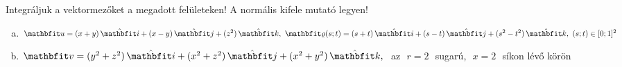 \documentclass[exercise]{math-standalone}
\begin{document}
\begin{exercise}{%
    Integráljuk a vektormezőket a megadott felületeken!
    A normális kifele mutató legyen!
  }
  \begin{enumerate}[a)]
    \item $\rvec u = \ijk{x + y}{x - y}{z^2}, \,\, \surfv (s;t) = \ijk{s + t}{s - t}{s^2 - t^2}, \,\, (s;t) \in [0;1]^2$
    \item $\rvec v = \ijk{y^2 + z^2}{x^2 + z^2}{x^2 + y^2}, \,\,$ az $\,\,r = 2\,\,$ sugarú, $\,\,x = 2\,\,$ síkon lévő körön
  \end{enumerate}

\end{exercise}
\end{document}
